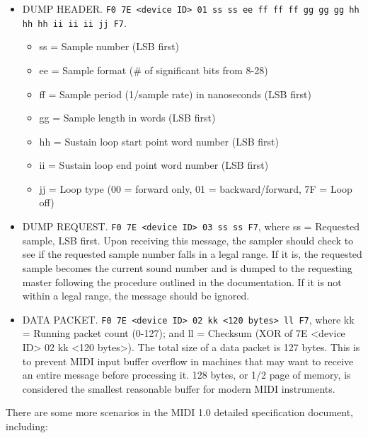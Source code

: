    \begin{itemize}
      \item DUMP HEADER.
         \texttt{F0 7E <device ID> 01 ss ss ee ff ff ff
            gg gg gg hh hh hh ii ii ii jj F7}.
         \begin{itemize}
            \item ss = Sample number (LSB first)
            \item ee = Sample format (\# of significant bits from 8-28)
            \item ff = Sample period (1/sample rate) in nanoseconds (LSB first)
            \item gg = Sample length in words (LSB first)
            \item hh = Sustain loop start point word number (LSB first)
            \item ii = Sustain loop end point word number (LSB first)
            \item jj = Loop type (00 = forward only, 01 = backward/forward,
               7F = Loop off)
         \end{itemize}
      \item DUMP REQUEST.
         \texttt{F0 7E <device ID> 03 ss ss F7}, where ss =
         Requested sample, LSB first.
         Upon receiving this message, the sampler should check to see if the
         requested sample number falls in a legal range.
         If it is, the requested sample becomes the current sound
         number and is dumped to the requesting master following the
         procedure outlined in the documentation.
         If it is not within a legal range, the message should be ignored.
      \item DATA PACKET.
         \texttt{F0 7E <device ID> 02 kk <120 bytes> ll F7}, where
         kk = Running packet count (0-127); and
         ll = Checksum (XOR of 7E <device ID> 02 kk <120 bytes>).
      The total size of a data packet is 127 bytes. This is to prevent MIDI
      input buffer overflow in machines that may want to receive an
      entire message before processing it. 128
      bytes, or 1/2 page of memory, is
      considered the smallest reasonable buffer for modern MIDI instruments.
   \end{itemize}

   There are some more scenarios in the MIDI 1.0 detailed specification
   document, including:

